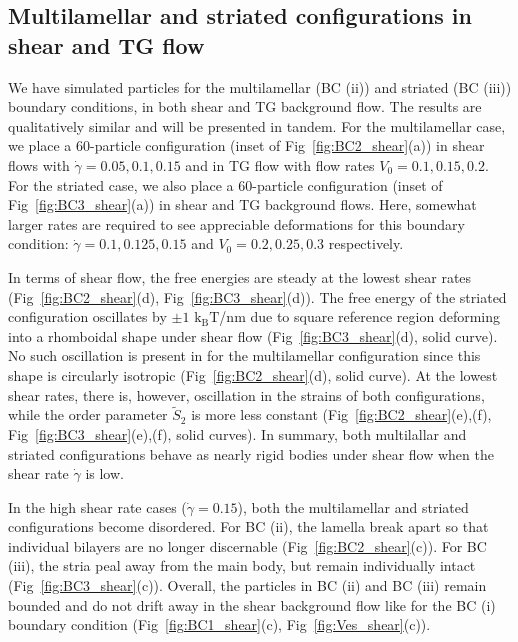 \documentclass[prb,preprint,showpacs,preprintnumbers,amsmath,amssymb,longbibliography]{revtex4-1}
\begin{document}
\subsection{Multilamellar and striated configurations in shear and TG flow}
We have simulated particles for the multilamellar (BC (ii)) and striated (BC (iii))
boundary conditions, in both shear and TG background flow.  The results are
qualitatively similar and will be presented in tandem. 
For the multilamellar case, we place a 60-particle configuration (inset of Fig~\ref{fig:BC2_shear}(a))
in shear flows with $\dot\gamma=0.05, 0.1, 0.15$ and in TG flow with flow rates $V_0=0.1, 0.15, 0.2$.
For the striated case, we also place a 60-particle configuration (inset of Fig~\ref{fig:BC3_shear}(a))
in shear and TG background flows.  Here, somewhat larger rates are required to see appreciable
deformations for this boundary condition: $\dot\gamma=0.1, 0.125, 0.15$
and $V_0=0.2, 0.25, 0.3$ respectively.  

In terms of shear flow, the free energies are steady at the lowest shear 
rates (Fig~\ref{fig:BC2_shear}(d), Fig~\ref{fig:BC3_shear}(d)).
The free energy of the striated configuration oscillates by $\pm 1$ $\mathrm{k_BT}$/nm
due to square reference region deforming into a rhomboidal shape under shear
flow (Fig~\ref{fig:BC3_shear}(d), solid curve).  No such oscillation
is present in for the multilamellar configuration since this shape is circularly
isotropic (Fig~\ref{fig:BC2_shear}(d), solid curve).
At the lowest shear rates, there is, however, oscillation in the strains
of both configurations, 
while the order parameter $\tilde S_2$ is more less constant
(Fig~\ref{fig:BC2_shear}(e),(f), Fig~\ref{fig:BC3_shear}(e),(f), solid curves).
In summary, both multilallar and striated configurations behave as nearly
rigid bodies under shear flow when the shear rate $\dot \gamma$ is low.

In the high shear rate cases ($\dot\gamma=0.15$), both the
multilamellar and striated configurations become disordered.  For BC (ii),
the lamella break apart so that individual bilayers are no longer discernable
(Fig~\ref{fig:BC2_shear}(c)).
For BC (iii), the stria peal away from the main body,
but remain individually intact (Fig~\ref{fig:BC3_shear}(c)).  
Overall, the particles in BC (ii) and BC (iii) remain bounded
and do not drift away in the shear background flow like for the
BC (i) boundary condition (Fig~\ref{fig:BC1_shear}(c),
Fig~\ref{fig:Ves_shear}(c)).
\end{document}
